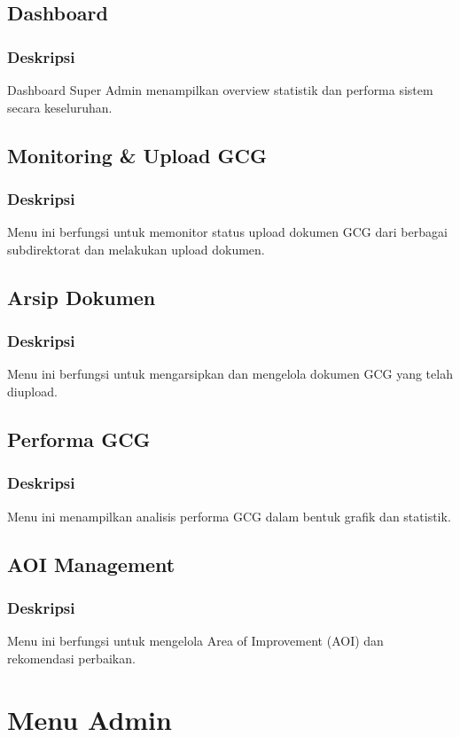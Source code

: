 \documentclass[12pt,a4paper]{article}
\begin{document}
\subsection{Dashboard}
\subsubsection{Deskripsi}
Dashboard Super Admin menampilkan overview statistik dan performa sistem secara keseluruhan.

\subsection{Monitoring \& Upload GCG}
\subsubsection{Deskripsi}
Menu ini berfungsi untuk memonitor status upload dokumen GCG dari berbagai subdirektorat dan melakukan upload dokumen.

\subsection{Arsip Dokumen}
\subsubsection{Deskripsi}
Menu ini berfungsi untuk mengarsipkan dan mengelola dokumen GCG yang telah diupload.

\subsection{Performa GCG}
\subsubsection{Deskripsi}
Menu ini menampilkan analisis performa GCG dalam bentuk grafik dan statistik.

\subsection{AOI Management}
\subsubsection{Deskripsi}
Menu ini berfungsi untuk mengelola Area of Improvement (AOI) dan rekomendasi perbaikan.

\section{Menu Admin}
\end{document}
